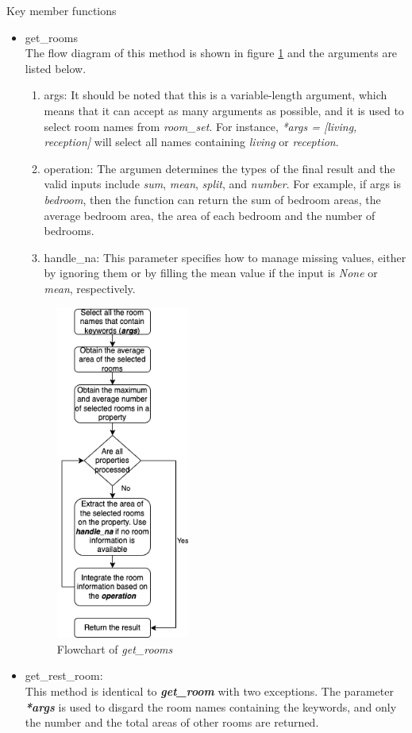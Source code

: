 \documentclass[12pt,twoside]{report}
\begin{document}
Key member functions
\begin{itemize}
	\item get\_rooms \\
	The flow diagram of this method is shown in figure \ref{extract_room_get_rooms} and the arguments are listed below.
	\begin{enumerate}
		\item args: It should be noted that this is a variable-length argument, which means that it can accept as many arguments as possible, and it is used to select room names from \textit{room\_set}. For instance, \textit{*args = [living, reception]} will select all names containing \textit{living} or \textit{reception}. 
		\item operation: The argumen determines the types of the final result and the valid inputs include \textit{sum}, \textit{mean}, \textit{split}, and \textit{number}. For example, if args is \textit{bedroom}, then the function can return the sum of bedroom areas, the average bedroom area, the area of each bedroom and the number of bedrooms. 
		\item handle\_na: This parameter specifies how to manage missing values, either by ignoring them or by filling the mean value if the input is \textit{None} or \textit{mean}, respectively. 
	\end{enumerate} 
	\begin{figure}[h]
		\centering
		\includegraphics[height=11cm]{extract_room_get_rooms}
		\caption{Flowchart of \textit{get\_rooms}}
		\label{extract_room_get_rooms}
	\end{figure}
	\item get\_rest\_room: \\
	This method is identical to \textit{\textbf{get\_room}} with two exceptions. The parameter \textit{\textbf{*args}} is used to disgard the room names containing the keywords, and only the number and the total areas of other rooms are returned. 
\end{itemize}
\end{document}
